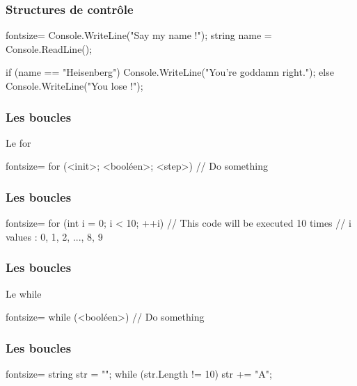 \begin{frame}[fragile]
  \frametitle{Structures de contrôle}

  \begin{csharpcode*}{fontsize=\scriptsize}
    Console.WriteLine("Say my name !");
    string name = Console.ReadLine();

    if (name == "Heisenberg")
    {
      Console.WriteLine("You're goddamn right.");
    }
    else
    {
      Console.WriteLine("You lose !");
    }
  \end{csharpcode*}
\end{frame}

\begin{frame}[fragile]
  \frametitle{Les boucles}

  \begin{center}{\large Le for}\end{center}
  \begin{csharpcode*}{fontsize=\scriptsize}
    for (<init>; <booléen>; <step>)
    {
      // Do something
    }
  \end{csharpcode*}
\end{frame}

\begin{frame}[fragile]
  \frametitle{Les boucles}

  \begin{csharpcode*}{fontsize=\scriptsize}
    for (int i = 0; i < 10; ++i)
    {
      // This code will be executed 10 times
      // i values : 0, 1, 2, ..., 8, 9
    }
  \end{csharpcode*}
\end{frame}

\begin{frame}[fragile]
  \frametitle{Les boucles}

  \begin{center}{\large Le while}\end{center}
  \begin{csharpcode*}{fontsize=\scriptsize}
    while (<booléen>)
    {
      // Do something
    }
  \end{csharpcode*}
\end{frame}

\begin{frame}[fragile]
  \frametitle{Les boucles}

  \begin{csharpcode*}{fontsize=\scriptsize}
    string str = "";
    while (str.Length != 10)
    {
      str += "A";
    }
  \end{csharpcode*}
\end{frame}

